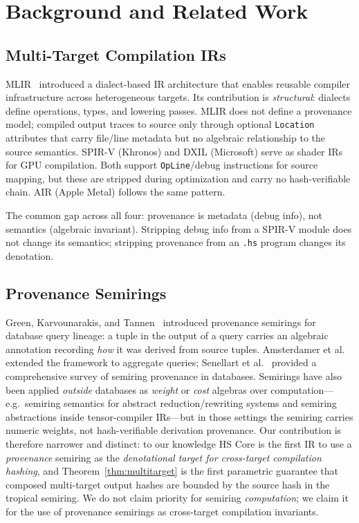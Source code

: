 \documentclass[sigconf,nonacm]{acmart}
\newcommand{\hscore}{\texttt{.hs}}
\begin{document}
\section{Background and Related Work}
\label{sec:related}

\subsection{Multi-Target Compilation IRs}
MLIR~\cite{mlir-lattner2020} introduced a dialect-based IR
architecture that enables reusable compiler infrastructure
across heterogeneous targets. Its contribution is
\emph{structural}: dialects define operations, types, and
lowering passes. MLIR does not define a provenance model;
compiled output traces to source only through optional
\texttt{Location} attributes that carry file/line metadata
but no algebraic relationship to the source semantics.
SPIR-V (Khronos) and DXIL (Microsoft) serve as shader IRs
for GPU compilation. Both support \texttt{OpLine}/debug
instructions for source mapping, but these are stripped
during optimization and carry no hash-verifiable chain.
AIR (Apple Metal) follows the same pattern.

The common gap across all four: provenance is metadata
(debug info), not semantics (algebraic invariant). Stripping
debug info from a SPIR-V module does not change its
semantics; stripping provenance from an \hscore{} program
changes its denotation.

\subsection{Provenance Semirings}
Green, Karvounarakis, and Tannen~\cite{green-semiring2007}
introduced provenance semirings for database query lineage:
a tuple in the output of a query carries an algebraic
annotation recording \emph{how} it was derived from source
tuples. Amsterdamer et al.~\cite{amsterdamer-2011} extended
the framework to aggregate queries; Senellart et
al.~\cite{senellart-2018} provided a comprehensive survey
of semiring provenance in databases. Semirings have also been
applied \emph{outside} databases as \emph{weight} or \emph{cost}
algebras over computation---e.g.\ semiring semantics for abstract
reduction/rewriting systems and semiring abstractions inside
tensor-compiler IRs---but in those settings the semiring carries
numeric weights, not hash-verifiable derivation provenance. Our
contribution is therefore narrower and distinct: to our knowledge
HS Core is the first IR to use a \emph{provenance} semiring as the
\emph{denotational target for cross-target compilation hashing},
and Theorem~\ref{thm:multitarget} is the first parametric guarantee
that composed multi-target output hashes are bounded by the source
hash in the tropical semiring. We do not claim priority for semiring
\emph{computation}; we claim it for the use of provenance semirings
as cross-target compilation invariants.
\end{document}
